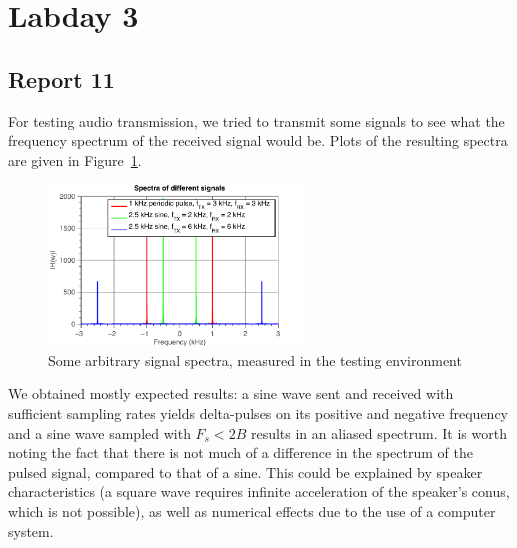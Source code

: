 \documentclass[11pt,titlepage]{report}
\begin{document}
\section{Labday 3}
\subsection{Report 11}
For testing audio transmission, we tried to transmit some signals to see what the frequency spectrum of the received signal would be. Plots of the resulting spectra are given in Figure~\ref{fig:rep11-test-spectra}.

\begin{figure}[H]
	\centering
	\includegraphics[width=0.6\textwidth]{resource/ass-1-report-11-random-signals.pdf}
	\caption{Some arbitrary signal spectra, measured in the testing environment}
	\label{fig:rep11-test-spectra}
\end{figure}

We obtained mostly expected results: a sine wave sent and received with sufficient sampling rates yields delta-pulses on its positive and negative frequency and a sine wave sampled with $F_s < 2B$ results in an aliased spectrum. It is worth noting the fact that there is not much of a difference in the spectrum of the pulsed signal, compared to that of a sine. This could be explained by speaker characteristics (a square wave requires infinite acceleration of the speaker's conus, which is not possible), as well as numerical effects due to the use of a computer system.
\end{document}
